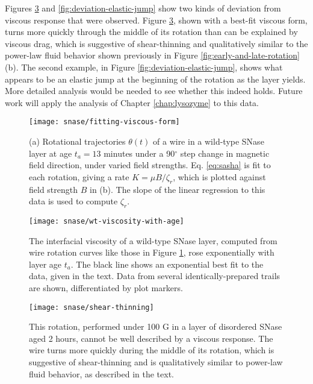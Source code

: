 Figures \ref{fig:deviation-shear-thinning} and \ref{fig:deviation-elastic-jump} show two kinds of deviation from viscous response that were observed. Figure \ref{fig:deviation-shear-thinning}, shown with a best-fit viscous form, turns more quickly through the middle of its rotation than can be explained by viscous drag, which is suggestive of shear-thinning and qualitatively similar to the power-law fluid behavior shown previously in Figure \ref{fig:early-and-late-rotation}(b). The second example, in Figure \ref{fig:deviation-elastic-jump}, shows what appears to be an elastic jump at the beginning of the rotation as the layer yields. More detailed analysis would be needed to see whether this indeed holds. Future work will apply the analysis of Chapter \ref{chap:lysozyme} to this data.

   \begin{figure}
    \centering
    \texttt{[image: snase/fitting-viscous-form]} %
    \caption{\label{fig:fitting-viscous-form}(a) Rotational trajectories $\theta(t)$ of a wire in a wild-type SNase layer at age $t_a=13$ minutes under a 90$^\circ$ step change in magnetic field direction, under varied field strengths. Eq. \ref{eq:sasha} is fit to each rotation, giving a rate $K=\mu B/\zeta_r$, which is plotted against field strength $B$ in (b). The slope of the linear regression to this data is used to compute $\zeta_r$.}
    \end{figure}

   \begin{figure}
    \centering
    \texttt{[image: snase/wt-viscosity-with-age]}
    \caption{\label{fig:wt-viscosity-with-age}The interfacial viscosity of a wild-type SNase layer, computed from wire rotation curves like those in Figure \ref{fig:fitting-viscous-form}, rose exponentially with layer age $t_a$. The black line shows an exponential best fit to the data, given in the text. Data from several identically-prepared trails are shown, differentiated by plot markers.}
    \end{figure}
    
\begin{figure}
    \centering
    \texttt{[image: snase/shear-thinning]} %
    \caption{\label{fig:deviation-shear-thinning}This rotation, performed under 100 G in a layer of disordered SNase aged 2 hours, cannot be well described by a viscous response. The wire turns more quickly during the middle of its rotation, which is suggestive of shear-thinning and is qualitatively similar to power-law fluid behavior, as described in the text.}
    \end{figure}
    
